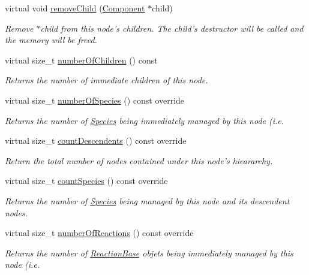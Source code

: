 \begin{DoxyCompactItemize}
virtual void \hyperlink{classComposite_a1e62d11f4c16844277b215a2069c14be}{remove\+Child} (\hyperlink{classComponent}{Component} $\ast$child)
\begin{DoxyCompactList}\small\item\em Remove $\ast$child from this node's children. The child's destructor will be called and the memory will be freed. \end{DoxyCompactList}\item 
virtual size\+\_\+t \hyperlink{classComposite_ab00f34ad7c8f7cd90ea9392bd54fd62a}{number\+Of\+Children} () const 
\begin{DoxyCompactList}\small\item\em Returns the number of immediate children of this node. \end{DoxyCompactList}\item 
virtual size\+\_\+t \hyperlink{classComposite_af36fb9ed49f7fc262c68b41f2b9a56f6}{number\+Of\+Species} () const override
\begin{DoxyCompactList}\small\item\em Returns the number of \hyperlink{classSpecies}{Species} being immediately managed by this node (i.\+e. \end{DoxyCompactList}\item 
virtual size\+\_\+t \hyperlink{classComposite_aad7cea9220c003254233ec9dc6bcb24e}{count\+Descendents} () const override
\begin{DoxyCompactList}\small\item\em Return the total number of nodes contained under this node's hieararchy. \end{DoxyCompactList}\item 
virtual size\+\_\+t \hyperlink{classComposite_ad3162a869285627b04c5388dc28e2719}{count\+Species} () const override
\begin{DoxyCompactList}\small\item\em Returns the number of \hyperlink{classSpecies}{Species} being managed by this node and its descendent nodes. \end{DoxyCompactList}\item 
virtual size\+\_\+t \hyperlink{classComposite_aee77e531ab9ccb8dcea12a307bd75539}{number\+Of\+Reactions} () const override
\begin{DoxyCompactList}\small\item\em Returns the number of \hyperlink{classReactionBase}{Reaction\+Base} objets being immediately managed by this node (i.\+e. \end{DoxyCompactList}\item 

\end{DoxyCompactItemize}
